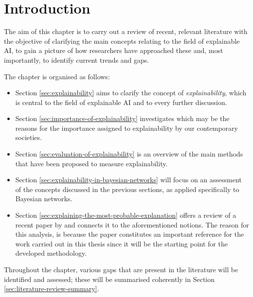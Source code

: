 \section{Introduction} \label{sec:literature-review-introduction}
The aim of this chapter is to carry out a review of recent, relevant literature with the objective of clarifying the main concepts relating to the field of explainable AI, to gain a picture of how researchers have approached these and, most importantly, to identify current trends and gaps.

The chapter is organised as follows:
\begin{itemize}
  \item Section \ref{sec:explainability} aims to clarify the concept of \textit{explainability}, which is central to the field of explainable AI and to every further discussion.
  \item Section \ref{sec:importance-of-explainability} investigates which may be the reasons for the importance assigned to explainability by our contemporary societies.
  \item Section \ref{sec:evaluation-of-explainability} is an overview of the main methods that have been proposed to measure explainability.
  \item Section \ref{sec:explainability-in-bayesian-networks} will focus on an assessment of the concepts discussed in the previous sections, as applied specifically to Bayesian networks.
  \item Section \ref{sec:explaining-the-most-probable-explanation} offers a review of a recent paper by \citet{Butz2018} and connects it to the aforementioned notions.
  The reason for this analysis, is because the paper constitutes an important reference for the work carried out in this thesis since it will be the starting point for the developed methodology.
\end{itemize}

Throughout the chapter, various gaps that are present in the literature will be identified and assessed; these will be summarised coherently in Section \ref{sec:literature-review-summary}.